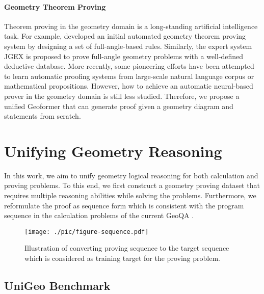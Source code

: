 \documentclass[11pt]{article}
\begin{document}
\paragraph{Geometry Theorem Proving} Theorem proving in the geometry domain \cite{gelernter1960empirical,chou1996automated,chou2000deductive,jgex2011,yu2019framework,gan2019automatically} is a long-standing artificial intelligence task. For example, \cite{chou1996automated} developed an initial automated geometry theorem proving system by designing a set of full-angle-based rules. Similarly, the expert system JGEX \cite{jgex2011} is proposed to prove full-angle geometry problems with a well-defined deductive database. 
More recently, some pioneering efforts \cite{li2020isarstep,tafjord2020proofwriter,welleck2021naturalproofs} have been attempted to learn automatic proofing systems from large-scale natural language corpus or mathematical propositions. 
However, how to achieve an automatic neural-based prover in the geometry domain is still less studied. Therefore, we propose a unified Geoformer that can generate proof given a geometry diagram and statements from scratch.


\section{Unifying Geometry Reasoning}

In this work, we aim to unify geometry logical reasoning for both calculation and proving problems.
To this end, we first construct a geometry proving dataset that requires multiple reasoning abilities while solving the problems. Furthermore, we reformulate the proof as sequence form which is consistent with the program sequence in the calculation problems of the current GeoQA \cite{chen2021geoqa}.

\begin{figure*}[t]
\begin{center}
 \texttt{[image: ./pic/figure-sequence.pdf]}
\end{center}
\vspace{-4mm}
  \caption{
  Illustration of converting proving sequence to the target sequence which is considered as training target for the proving problem.
  }
\vspace{-2mm}
\label{fig:sequence}
\end{figure*}

\subsection{UniGeo Benchmark}
\end{document}
